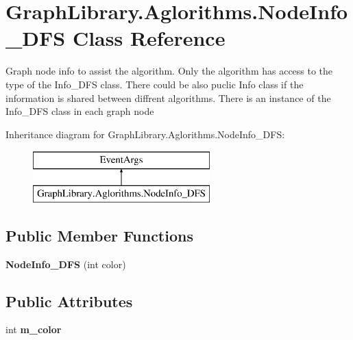 \hypertarget{class_graph_library_1_1_aglorithms_1_1_node_info___d_f_s}{}\section{Graph\+Library.\+Aglorithms.\+Node\+Info\+\_\+\+D\+F\+S Class Reference}
\label{class_graph_library_1_1_aglorithms_1_1_node_info___d_f_s}


Graph node info to assist the algorithm. Only the algorithm has access to the type of the Info\+\_\+\+D\+F\+S class. There could be also puclic Info class if the information is shared between diffrent algorithms. There is an instance of the Info\+\_\+\+D\+F\+S class in each graph node  


Inheritance diagram for Graph\+Library.\+Aglorithms.\+Node\+Info\+\_\+\+D\+F\+S\+:\begin{figure}[H]
\begin{center}
\leavevmode
\includegraphics[height=2.000000cm]{class_graph_library_1_1_aglorithms_1_1_node_info___d_f_s}
\end{center}
\end{figure}
\subsection*{Public Member Functions}
\begin{DoxyCompactItemize}
\item 
\hypertarget{class_graph_library_1_1_aglorithms_1_1_node_info___d_f_s_ae88c8f29f110f22b7bbd4d6c7112a5ef}{}{\bfseries Node\+Info\+\_\+\+D\+F\+S} (int color)\label{class_graph_library_1_1_aglorithms_1_1_node_info___d_f_s_ae88c8f29f110f22b7bbd4d6c7112a5ef}

\end{DoxyCompactItemize}
\subsection*{Public Attributes}
\begin{DoxyCompactItemize}
\item 
\hypertarget{class_graph_library_1_1_aglorithms_1_1_node_info___d_f_s_a9e2567b2a65afa785c3ed74e2d80d9e5}{}int {\bfseries m\+\_\+color}\label{class_graph_library_1_1_aglorithms_1_1_node_info___d_f_s_a9e2567b2a65afa785c3ed74e2d80d9e5}

\end{DoxyCompactItemize}


